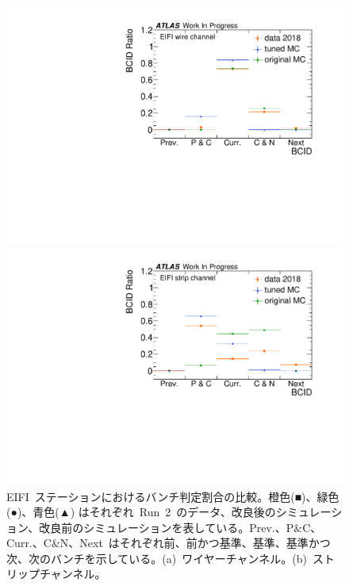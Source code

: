\begin{figure}[tbp]
	\begin{minipage}{0.49\hsize}
	\centering
	\includegraphics[width=\textwidth,page=1]{img/rec/M4wire.pdf}
	\subcaption{}
	\end{minipage}
	\begin{minipage}{0.49\hsize}
	\centering
	\includegraphics[width=\textwidth,page=1]{img/rec/M4strip.pdf}
	\subcaption{}
	\end{minipage}
	\caption[EIFI~ステーションにおけるバンチ判定割合の比較]{EIFI~ステーションにおけるバンチ判定割合の比較。橙色(■)、緑色(●)、青色(▲) はそれぞれ~Run~2~のデータ、改良後のシミュレーション、改良前のシミュレーションを表している。Prev.、P$\&$C、Curr.、C$\&$N、Next~はそれぞれ前、前かつ基準、基準、基準かつ次、次のバンチを示している。(a)~ワイヤーチャンネル。(b)~ストリップチャンネル。}
	\label{fig:M4bcid}
\end{figure}


